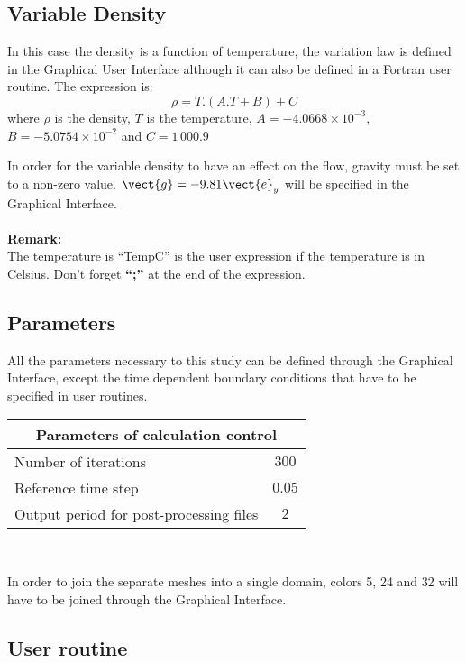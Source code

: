         \subsection{Variable Density}
In this case the density is a function of temperature, the variation law is defined
 in the Graphical User Interface although it can also be defined in a Fortran user
routine. The expression is:
\begin{equation}
\rho = T.(A.T + B) + C
\end{equation}
where $\rho$ is the density, $T$ is the temperature, $A = -4.0668\times10^{-3}$,
$B =-5.0754\times 10^{-2}$ and $C = 1\,000.9$

In order for the variable density to have an effect on the flow, gravity must be
set to a non-zero value. $\vect{g} = -9.81 \vect{e}_y$ will be specified in the
Graphical Interface.\\
\\
\textbf{Remark:}\\
The temperature is ``TempC'' is the user expression if the temperature is in Celsius.
Don't forget \textbf{``;''} at the end of the expression.

        \subsection{Parameters}

All the parameters necessary to this study can be defined through the Graphical
Interface, except the time dependent boundary conditions that have to be specified
in user routines.

\begin{center}
\begin{tabular}{|l|c|}
\hline
\multicolumn{2}{|c|}{Parameters of calculation control} \\
\hline
Number of iterations & $300$ \\
\hline
Reference time step & $0.05$ \\
\hline
Output period for post-processing files& $2$ \\
\hline
\end{tabular}\\
\end{center}

In order to join the separate meshes into a single domain, colors 5, 24 and 32
will have to be joined through the Graphical Interface.


        \subsection{User routine}

